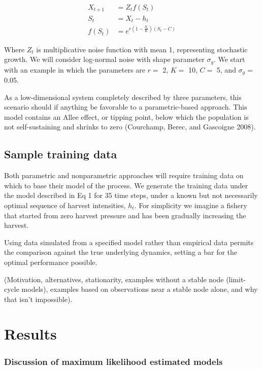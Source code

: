 \documentclass[author-year, review]{elsarticle} %
\begin{document}
\begin{align}
X_{t+1} &= Z_t f(S_t) \\
S_t &= X_t - h_t \\
f(S_t) &= e^{r \left(1 - \frac{S_t}{K}\right)\left(S_t - C\right)}
\end{align}

Where $Z_t$ is multiplicative noise function with mean 1, representing
stochastic growth. We will consider log-normal noise with shape
parameter $\sigma_g$. We start with an example in which the parameters
are $r =$ 2, $K =$ 10, $C =$ 5, and $\sigma_g =$ 0.05.

As a low-dimensional system completely described by three parameters,
this scenario should if anything be favorable to a parametric-based
approach. This model contains an Allee effect, or tipping point, below
which the population is not self-sustaining and shrinks to zero
(Courchamp, Berec, and Gascoigne 2008).

\subsection{Sample training data}

Both parametric and nonparametric approaches will require training data
on which to base their model of the process. We generate the training
data under the model described in Eq 1 for 35 time steps, under a known
but not necessarily optimal sequence of harvest intensities, $h_t$. For
simplicity we imagine a fishery that started from zero harvest pressure
and has been gradually increasing the harvest.

Using data simulated from a specified model rather than empirical data
permits the comparison against the true underlying dynamics, setting a
bar for the optimal performance possible.

(Motivation, alternatives, stationarity, examples without a stable node
(limit-cycle models), examples based on observations near a stable node
alone, and why that isn't impossible).

\section{Results}

\subsubsection{Discussion of maximum likelihood estimated models}
\end{document}
